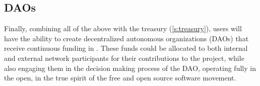 \subsection{DAOs}
Finally, combining all of the above with the \oscoin{} treasury
(\ref{s:treasury}), users will have the ability to create decentralized
autonomous organizations (DAOs) that receive continuous funding in \oscoin{}.
These funds could be allocated to both internal and external network
participants for their contributions to the project, while also engaging them
in the decision making process of the DAO, operating fully in the open, in the
true spirit of the free and open source software movement.

